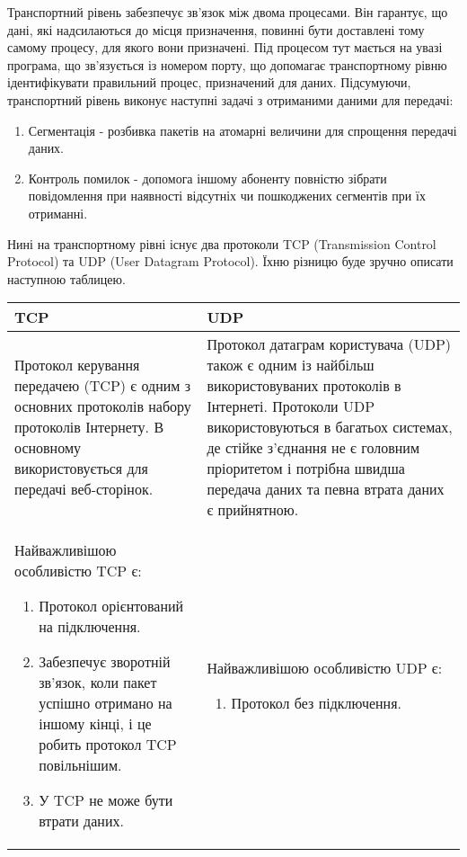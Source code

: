 \begin{itemize}
    Транспортний рівень забезпечує зв'язок між двома процесами. Він гарантує, що дані, які надсилаються до місця призначення, повинні бути доставлені тому самому процесу, для якого вони призначені. Під процесом тут мається на увазі програма, що зв'язується із номером порту, що допомагає транспортному рівню ідентифікувати правильний процес, призначений для даних.
    Підсумуючи, транспортний рівень виконує наступні задачі з отриманими даними для передачі:
    \begin{enumerate}
        \item Сегментація - розбивка пакетів на атомарні величини для спрощення передачі даних.
        \item Контроль помилок - допомога іншому абоненту повністю зібрати повідомлення при наявності відсутніх чи пошкоджених сегментів при їх отриманні.
    \end{enumerate}
    Нині на транспортному рівні існує два протоколи TCP (Transmission Control Protocol) та UDP (User Datagram Protocol). Їхню різницю буде зручно описати наступною таблицею.
    \begin{table}[ht]
    \label{tab:tcp_diff_udp}
    \begin{tabularx}{\textwidth}{X|X}
          \textbf{TCP} & \textbf{UDP} \\
        \hline
        Протокол керування передачею (TCP) є одним з основних протоколів набору протоколів Інтернету. В основному використовується для передачі веб-сторінок. & Протокол датаграм користувача (UDP) також є одним із найбільш використовуваних протоколів в Інтернеті. Протоколи UDP використовуються в багатьох системах, де стійке з’єднання не є головним пріоритетом і потрібна швидша передача даних та певна втрата даних є прийнятною. \\
        \hline
        Найважливішою особливістю TCP є:
            \begin{enumerate}
                \item Протокол орієнтований на підключення.
                \item Забезпечує зворотній зв'язок, коли пакет успішно отримано на іншому кінці, і це робить протокол TCP повільнішим.
                \item У TCP не може бути втрати даних.
            \end{enumerate}
             & Найважливішою особливістю UDP є:
            \begin{enumerate}
                \item Протокол без підключення.

\end{enumerate}
\end{tabularx}
\end{table}
\end{itemize}
